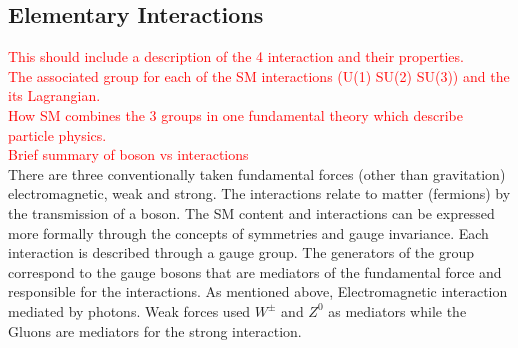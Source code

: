 \subsection{Elementary Interactions}
\label{chap1:SM:EI}
\textcolor{red}{This should include a description of the 4 interaction and their properties.\\
The associated group for each of the SM interactions (U(1) SU(2) SU(3)) and the its Lagrangian.\\
How SM combines the 3 groups in one fundamental theory which describe particle physics.\\
Brief summary of boson vs interactions
} \\
There are three conventionally taken fundamental forces (other than gravitation) electromagnetic, weak and strong. The interactions relate to matter (fermions) by the transmission of a boson. The SM content and interactions can be expressed more formally through the concepts of symmetries and gauge invariance. Each interaction is described through a gauge group. The generators of the group correspond to the gauge bosons that are mediators of the fundamental force and responsible for the interactions. As mentioned above, Electromagnetic interaction mediated by photons. Weak forces used $W^{\pm}$ and $Z^{0}$ as mediators while the Gluons are mediators for the strong interaction.
